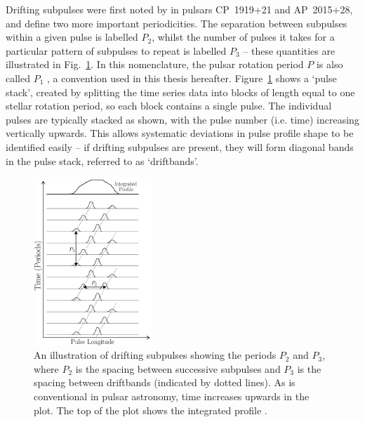 Drifting subpulses were first noted by \citet{DCxx1968} in pulsars CP~1919+21 and AP~2015+28, and define two more important periodicities. The separation between subpulses within a given pulse is labelled $P_2$, whilst the number of pulses it takes for a particular pattern of subpulses to repeat is labelled $P_3$ \citep{SSPW1970} -- these quantities are illustrated in Fig.~\ref{fig: intro - drifting subpulses}. In this nomenclature, the pulsar rotation period $P$ is also called $P_1$ \citep{Bxxx1973}, a convention used in this thesis hereafter. Figure~\ref{fig: intro - drifting subpulses} shows a `pulse stack', created by splitting the time series data into blocks of length equal to one stellar rotation period, so each block contains a single pulse. The individual pulses are typically stacked as shown, with the pulse number (i.e. time) increasing vertically upwards. This allows systematic deviations in pulse profile shape to be identified easily -- if drifting subpulses are present, they will form diagonal bands in the pulse stack, referred to as `driftbands'.  
\begin{figure}
	\centering
	\includegraphics[width=0.4\textwidth]{Figures/Introduction/drifting_subpulses}
    \caption[Drifting subpulses and the definitions of $P_2$ and $P_3$]{An illustration of drifting subpulses showing the periods $P_2$ and $P_3$, where $P_2$ is the spacing between successive subpulses and $P_3$ is the spacing between driftbands (indicated by dotted lines). As is conventional in pulsar astronomy, time increases upwards in the plot. The top of the plot shows the integrated profile \citep[after][]{Bxxx1973}.}
    \label{fig: intro - drifting subpulses} 
\end{figure}


